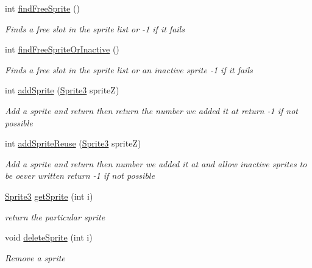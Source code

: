 \begin{DoxyCompactItemize}
int \mbox{\hyperlink{class_r_c___framework_1_1_sprite_list_a3d07b6b3927153b2dec5f13666908cfe}{find\+Free\+Sprite}} ()
\begin{DoxyCompactList}\small\item\em Finds a free slot in the sprite list or -\/1 if it fails \end{DoxyCompactList}\item 
int \mbox{\hyperlink{class_r_c___framework_1_1_sprite_list_a019afbeb0e8e39bbc9e5a5c6cf34f777}{find\+Free\+Sprite\+Or\+Inactive}} ()
\begin{DoxyCompactList}\small\item\em Finds a free slot in the sprite list or an inactive sprite -\/1 if it fails \end{DoxyCompactList}\item 
int \mbox{\hyperlink{class_r_c___framework_1_1_sprite_list_a8f45da7ee7263d6f9167a2961e14a412}{add\+Sprite}} (\mbox{\hyperlink{class_r_c___framework_1_1_sprite3}{Sprite3}} spriteZ)
\begin{DoxyCompactList}\small\item\em Add a sprite and return then return the number we added it at return -\/1 if not possible \end{DoxyCompactList}\item 
int \mbox{\hyperlink{class_r_c___framework_1_1_sprite_list_a0ff2817bd891443dd588b37aad792cf0}{add\+Sprite\+Reuse}} (\mbox{\hyperlink{class_r_c___framework_1_1_sprite3}{Sprite3}} spriteZ)
\begin{DoxyCompactList}\small\item\em Add a sprite and return then number we added it at and allow inactive sprites to be oever written return -\/1 if not possible \end{DoxyCompactList}\item 
\mbox{\hyperlink{class_r_c___framework_1_1_sprite3}{Sprite3}} \mbox{\hyperlink{class_r_c___framework_1_1_sprite_list_a430b89d680a7267307b61d7cb81d948d}{get\+Sprite}} (int i)
\begin{DoxyCompactList}\small\item\em return the particular sprite \end{DoxyCompactList}\item 
void \mbox{\hyperlink{class_r_c___framework_1_1_sprite_list_a6976b2d2feaf72f41d92a8981e595efb}{delete\+Sprite}} (int i)
\begin{DoxyCompactList}\small\item\em Remove a sprite \end{DoxyCompactList}\item 

\end{DoxyCompactItemize}
